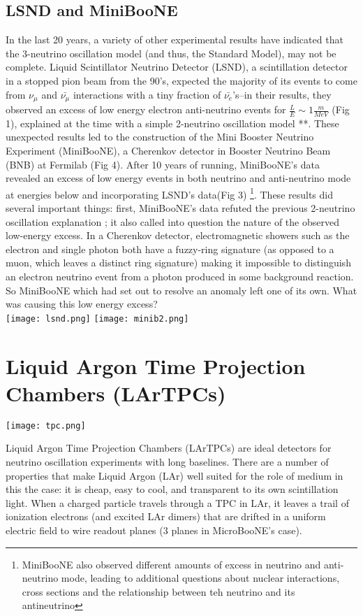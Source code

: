 \documentclass[12pt]{article}
\begin{document}
\subsection{LSND and MiniBooNE}
In the last 20 years, a variety of other experimental results have indicated that the 3-neutrino oscillation model (and thus, the Standard Model), may not be complete. Liquid Scintillator Neutrino Detector (LSND), a scintillation detector in a stopped pion beam from the 90's, expected the majority of its events to come from $\nu_\mu$ and $\bar{\nu_\mu}$ interactions with a tiny fraction of $\bar{\nu_e}$'s--in their results, they observed an excess of low energy electron anti-neutrino events for $\frac{L}{E} \sim 1 \frac{m}{MeV}$ (Fig 1), explained at the time with a simple 2-neutrino oscillation model \cite{lsnd}**. These unexpected results led to the construction of the Mini Booster Neutrino Experiment (MiniBooNE), a Cherenkov detector in Booster Neutrino Beam (BNB) at Fermilab (Fig 4). After 10 years of running, MiniBooNE's data revealed an excess of low energy events in both neutrino and anti-neutrino mode at energies below and incorporating LSND's data(Fig 3) \footnote{ MiniBooNE also observed different amounts of excess in neutrino and anti-neutrino mode, leading to additional questions about nuclear interactions, cross sections and the relationship between teh neutrino and its antineutrino\cite{miniboone}}.  These results did several important things: first, MiniBooNE's data refuted the previous 2-neutrino oscillation explanation \cite{miniboone}; it also called into question the nature of the observed low-energy excess. In a Cherenkov detector, electromagnetic showers such as the electron and single photon both have a fuzzy-ring signature (as opposed to a muon, which leaves a distinct ring signature) making it impossible to distinguish an electron neutrino event from a photon produced in some background reaction. So MiniBooNE which had set out to resolve an anomaly left one of its own. What was causing this low energy excess? 
\\\texttt{[image: lsnd.png]}
\texttt{[image: minib2.png]}


\section{Liquid Argon Time Projection Chambers (LArTPCs)}
\texttt{[image: tpc.png]}
\par Liquid Argon Time Projection Chambers (LArTPCs) are ideal detectors for neutrino oscillation experiments with long baselines.  There are a number of properties that make Liquid Argon (LAr) well suited for the role of medium in this the case: it is cheap, easy to cool, and transparent to its own scintillation light.  When a charged particle travels through a TPC in LAr, it leaves a trail of ionization electrons (and excited LAr dimers) that are drifted in a uniform electric field to wire readout planes (3 planes in MicroBooNE's case). 
\end{document}
